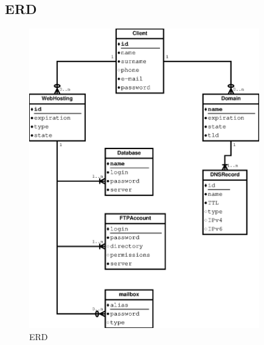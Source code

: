 \documentclass[11pt,a4paper]{article}
\begin{document}
    \subsection{ERD}

    \begin{figure}[ht]
      \begin{center}
        \includegraphics[width=10cm]{erd}
        \caption{ERD}
      \end{center}
    \end{figure}
\end{document}
